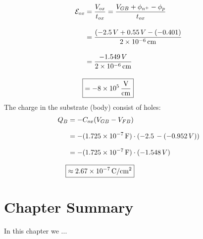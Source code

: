     \begin{align*}
        \mathcal{E}_{ox} &= \frac{V_{ox}}{t_{ox}} = \frac{V_{GB} + \phi_{n^+} - \phi_p}{t_{ox}}\\[0.35cm]
        &= \frac{(-2.5\,V + 0.55\,V -(-0.401)}{\SI{2e-6}{\cm}}\\[0.35cm]
        &= \frac{-1.549\,V}{\SI{2e-6}{\cm}}\\[0.35cm]
        \Aboxed{ &= \SI[per-mode = fraction]{-8e5}{\volt\per\cm} }
    \end{align*}
The charge in the substrate (body) consist of holes:
    \begin{align*}
        Q_B &= -C_{ox}(V_{GB} - V_{FB})\\[0.25cm]
        &= -(\SI{1.725e-7}{F})\cdot\left(-2.5\, -(-0.952\,V) \right)\\[0.25cm]
        &= -(\SI{1.725e-7}{F})\cdot(-1.548\,V)\\[0.25cm]
        \Aboxed{&\approx \SI[per-mode = fraction]{2.67e-7}{\coulomb\per\cm^2} }
    \end{align*}
\newpage
\section{Chapter Summary}
In this chapter we ...
